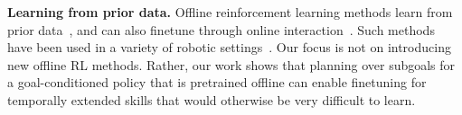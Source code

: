 \textbf{Learning from prior data.}
Offline reinforcement learning methods learn from prior data~\citep{lange2012batch, fujimoto2019off, kumar2019stabilizing, zhang2021brac, kumar2020conservative, fujimoto2021minimalist,singh2020cog}, and can also finetune through online interaction~\citep{nair2020awac, villaflor2020finetuning, lu2021awopt, Khazatsky2021WhatCI, lee2021finetuning, meng2021starcraft}. Such methods have been used in a variety of robotic settings~\citep{kalashnikov2018scalable,cabi2019scaling,kalashnikov2021mtopt,lu2021awopt}. Our focus is not on introducing new offline RL methods. Rather, our work shows that planning over subgoals for a goal-conditioned policy that is pretrained offline can enable finetuning for temporally extended skills that would otherwise be very difficult to learn.
